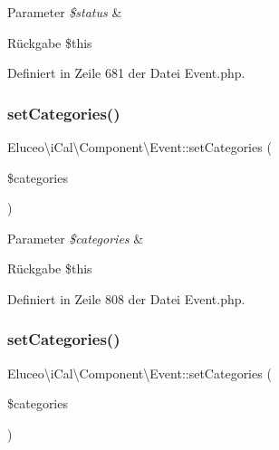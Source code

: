 \begin{DoxyParams}{Parameter}
{\em \$status} & \\
\hline
\end{DoxyParams}
\begin{DoxyReturn}{Rückgabe}
\$this 
\end{DoxyReturn}


Definiert in Zeile 681 der Datei Event.\+php.

\mbox{\label{class_eluceo_1_1i_cal_1_1_component_1_1_event_ab8e1826d0bbfa8741667e0c9c06ac186}} 
\subsubsection{\texorpdfstring{set\+Categories()}{setCategories()}\hspace{0.1cm}{\footnotesize\ttfamily [1/3]}}
{\footnotesize\ttfamily Eluceo\textbackslash{}i\+Cal\textbackslash{}\+Component\textbackslash{}\+Event\+::set\+Categories (\begin{DoxyParamCaption}\item[{}]{\$categories }\end{DoxyParamCaption})}


\begin{DoxyParams}{Parameter}
{\em \$categories} & \\
\hline
\end{DoxyParams}
\begin{DoxyReturn}{Rückgabe}
\$this 
\end{DoxyReturn}


Definiert in Zeile 808 der Datei Event.\+php.

\mbox{\label{class_eluceo_1_1i_cal_1_1_component_1_1_event_ab8e1826d0bbfa8741667e0c9c06ac186}} 
\subsubsection{\texorpdfstring{set\+Categories()}{setCategories()}\hspace{0.1cm}{\footnotesize\ttfamily [2/3]}}
{\footnotesize\ttfamily Eluceo\textbackslash{}i\+Cal\textbackslash{}\+Component\textbackslash{}\+Event\+::set\+Categories (\begin{DoxyParamCaption}\item[{}]{\$categories }\end{DoxyParamCaption})}



